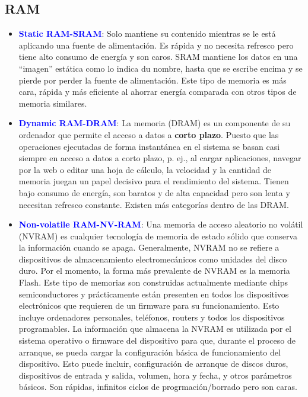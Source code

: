\documentclass[
	12pt, %
	fleqn, %
	a4paper, %
	oneside, %
]{LegrandOrangeBook}
\begin{document}
\subsection{RAM}
\begin{itemize}
\item \textbf{\textcolor{blue}{Static RAM-SRAM}}: Solo mantiene su contenido mientras se le está aplicando una fuente de alimentación. Es rápida y no necesita refresco pero tiene alto consumo de energía y son caros. SRAM mantiene los datos en una ``imagen'' estática como lo indica du nombre, hasta que se escribe encima y se pierde por perder la fuente de alimentación. Este tipo de memoria es más cara, rápida y más eficiente al ahorrar energía comparada con otros tipos de memoria similares.
\item \textbf{\textcolor{blue}{Dynamic RAM-DRAM}}: La memoria (DRAM) es un componente de su ordenador que permite el acceso a datos a \textbf{corto plazo}. Puesto que las operaciones ejecutadas de forma instantánea en el sistema se basan casi siempre en acceso a datos a corto plazo, p. ej., al cargar aplicaciones, navegar por la web o editar una hoja de cálculo, la velocidad y la cantidad de memoria juegan un papel decisivo para el rendimiento del sistema. Tienen bajo consumo de energía, son baratos y de alta capacidad pero son lenta y necesitan refresco constante. Existen más categorías dentro de las DRAM.
\item \textbf{\textcolor{blue}{Non-volatile RAM-NV-RAM}}: Una memoria de acceso aleatorio no volátil (NVRAM) es cualquier tecnología de memoria de estado sólido que conserva la información cuando se apaga. Generalmente, NVRAM no se refiere a dispositivos de almacenamiento electromecánicos como unidades del disco duro. Por el momento, la forma más prevalente de NVRAM es la memoria Flash. Este tipo de memorias son construidas actualmente mediante chips semiconductores y prácticamente están presenten en todos los dispositivos electrónicos que requieren de un firmware para su funcionamiento. Esto incluye ordenadores personales, teléfonos, routers y todos los dispositivos programables. La información que almacena la NVRAM es utilizada por el sistema operativo o firmware del dispositivo para que, durante el proceso de arranque, se pueda cargar la configuración básica de funcionamiento del dispositivo. Esto puede incluir, configuración de arranque de discos duros, dispositivos de entrada y salida, volumen, hora y fecha, y otros parámetros básicos. Son rápidas, infinitos ciclos de progrmación/borrado pero son caras.
\end{itemize}
\end{document}
